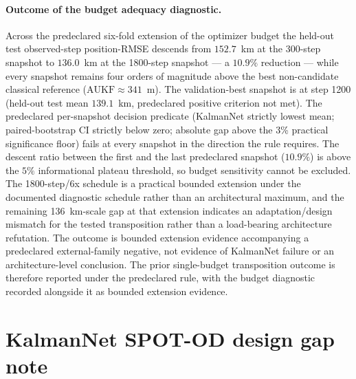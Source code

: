 \documentclass{article}
\begin{document}
\paragraph{Outcome of the budget adequacy diagnostic.}
Across the predeclared six-fold extension of the optimizer budget the held-out test observed-step position-RMSE descends from $152.7$~km at the 300-step snapshot to $136.0$~km at the 1800-step snapshot --- a $10.9\%$ reduction --- while every snapshot remains four orders of magnitude above the best non-candidate classical reference ($\textrm{AUKF}\approx 341$~m). The validation-best snapshot is at step 1200 (held-out test mean $139.1$~km, predeclared positive criterion not met). The predeclared per-snapshot decision predicate (KalmanNet strictly lowest mean; paired-bootstrap CI strictly below zero; absolute gap above the 3\% practical significance floor) fails at every snapshot in the direction the rule requires. The descent ratio between the first and the last predeclared snapshot ($10.9\%$) is above the $5\%$ informational plateau threshold, so budget sensitivity cannot be excluded. The 1800-step/6x schedule is a practical bounded extension under the documented diagnostic schedule rather than an architectural maximum, and the remaining 136~km-scale gap at that extension indicates an adaptation/design mismatch for the tested transposition rather than a load-bearing architecture refutation. The outcome is bounded extension evidence accompanying a predeclared external-family negative, not evidence of KalmanNet failure or an architecture-level conclusion. The prior single-budget transposition outcome is therefore reported under the predeclared rule, with the budget diagnostic recorded alongside it as bounded extension evidence.



\section{KalmanNet SPOT-OD design gap note}
\label{app:kalmannet-spot-od-feasibility}
\end{document}
